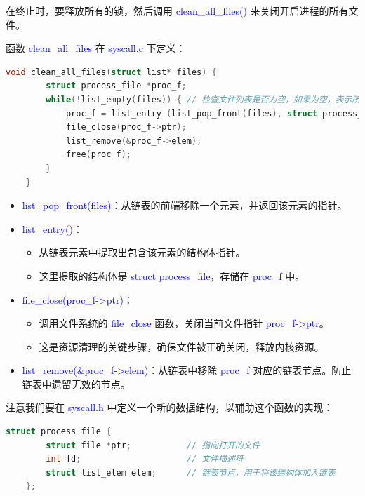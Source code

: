 \documentclass[14pt,a4paper,UTF8,twoside]{article}
\renewcommand{\texttt}[1]{\textcolor{blue}{\ttfamily #1}}
\begin{document}
在终止时，要释放所有的锁，然后调用 \texttt{clean\_all\_files()} 来关闭开启进程的所有文件。

函数 \texttt{clean\_all\_files} 在 \texttt{syscall.c} 下定义：

\begin{lstlisting}[language=C]
    void clean_all_files(struct list* files) {
        struct process_file *proc_f;
        while(!list_empty(files)) { // 检查文件列表是否为空，如果为空，表示所有的文件已经清理完毕
            proc_f = list_entry (list_pop_front(files), struct process_file, elem);
            file_close(proc_f->ptr);
            list_remove(&proc_f->elem);
            free(proc_f);
        }
    }
\end{lstlisting}

\begin{ctt}
    \begin{itemize}
        \item \texttt{list\_pop\_front(files)}：从链表的前端移除一个元素，并返回该元素的指针。
        
        \item \texttt{list\_entry()}：
        \begin{itemize}
            \item 从链表元素中提取出包含该元素的结构体指针。
            \item 这里提取的结构体是 \texttt{struct process\_file}，存储在 \texttt{proc\_f} 中。
        \end{itemize}
        
        \item \texttt{file\_close(proc\_f->ptr)}：
        \begin{itemize}
            \item 调用文件系统的 \texttt{file\_close} 函数，关闭当前文件指针 \texttt{proc\_f->ptr}。
            \item 这是资源清理的关键步骤，确保文件被正确关闭，释放内核资源。
        \end{itemize}
        
        \item \texttt{list\_remove(\&proc\_f->elem)}：从链表中移除 \texttt{proc\_f} 对应的链表节点。防止链表中遗留无效的节点。
    \end{itemize}
\end{ctt}

注意我们要在 \texttt{syscall.h} 中定义一个新的数据结构，以辅助这个函数的实现：

\begin{lstlisting}[language=C]
    struct process_file {
        struct file *ptr;           // 指向打开的文件
        int fd;                     // 文件描述符
        struct list_elem elem;      // 链表节点，用于将该结构体加入链表
    };    
\end{lstlisting}
\end{document}
